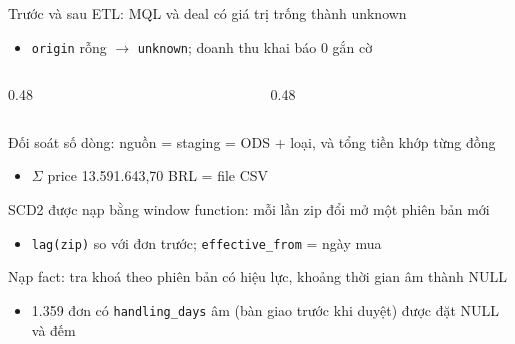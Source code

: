 \begin{frame}{Trước và sau ETL: MQL và deal có giá trị trống thành unknown}
\begin{itemize}
  \item \texttt{origin} rỗng $\rightarrow$ \texttt{unknown}; doanh thu khai báo 0 gắn cờ
\end{itemize}
\begin{columns}[c]\begin{column}{0.48\textwidth}\end{column}\begin{column}{0.48\textwidth}\end{column}\end{columns}

\end{frame}

\begin{frame}{Đối soát số dòng: nguồn = staging = ODS + loại, và tổng tiền khớp từng đồng}
\begin{itemize}
  \item $\Sigma$ price 13.591.643,70 BRL = file CSV
\end{itemize}

\end{frame}

\begin{frame}{SCD2 được nạp bằng window function: mỗi lần zip đổi mở một phiên bản mới}
\begin{itemize}
  \item \texttt{lag(zip)} so với đơn trước; \texttt{effective\_\allowbreak{}from} = ngày mua
\end{itemize}

\end{frame}

\begin{frame}{Nạp fact: tra khoá theo phiên bản có hiệu lực, khoảng thời gian âm thành NULL}
\begin{itemize}
  \item 1.359 đơn có \texttt{handling\_\allowbreak{}days} âm (bàn giao trước khi duyệt) được đặt NULL và đếm
\end{itemize}

\end{frame}

